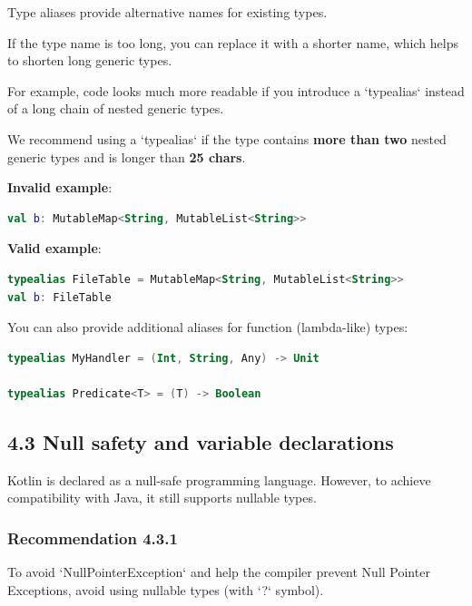 {{{{Type aliases provide alternative names for existing types.

If the type name is too long, you can replace it with a shorter name, which helps to shorten long generic types.

For example, code looks much more readable if you introduce a `typealias` instead of a long chain of nested generic types.

We recommend using a `typealias` if the type contains \textbf{more than two} nested generic types and is longer than \textbf{25 chars}.



\textbf{Invalid example}:

\begin{lstlisting}[language=Kotlin]
val b: MutableMap<String, MutableList<String>>
\end{lstlisting}


\textbf{Valid example}:

\begin{lstlisting}[language=Kotlin]
typealias FileTable = MutableMap<String, MutableList<String>>
val b: FileTable
\end{lstlisting}


You can also provide additional aliases for function (lambda-like) types:

\begin{lstlisting}[language=Kotlin]
typealias MyHandler = (Int, String, Any) -> Unit

typealias Predicate<T> = (T) -> Boolean
\end{lstlisting}


\subsection*{\textbf{4.3 Null safety and variable declarations}}

Kotlin is declared as a null-safe programming language. However, to achieve compatibility with Java, it still supports nullable types.



\subsubsection*{\textbf{Recommendation 4.3.1}}
\leavevmode\newline

To avoid `NullPointerException` and help the compiler prevent Null Pointer Exceptions, avoid using nullable types (with `?` symbol).



}}}}
